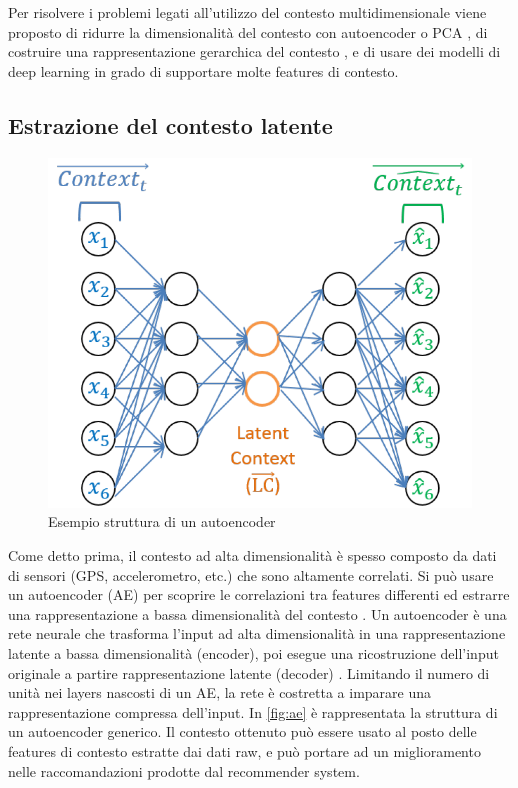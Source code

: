 \documentclass[12pt,italian]{report}
\begin{document}
Per risolvere i problemi legati all'utilizzo del contesto multidimensionale viene proposto di ridurre la dimensionalità del contesto con autoencoder o PCA \cite{latent-context} \cite{context-autoencoder}, di costruire una rappresentazione gerarchica del contesto \cite{hierarchical-context}, e di usare dei modelli di deep learning in grado di supportare molte features di contesto\cite{context-aware-deep-learning}.

\subsection{Estrazione del contesto latente} 
\label{ssec:latent-context}
\begin{figure}
 \centering
  \includegraphics[scale=0.70]{immagini/autoencoder.png}
  \caption{Esempio struttura di un autoencoder}
  \label{fig:ae}
\end{figure}

Come detto prima, il contesto ad alta dimensionalità è spesso composto da dati di sensori (GPS, accelerometro, etc.) che sono altamente correlati. Si può usare un autoencoder (AE) per scoprire le correlazioni tra features differenti ed estrarre una rappresentazione a bassa dimensionalità del contesto \cite{latent-context}. Un autoencoder è una rete neurale che trasforma l'input ad alta dimensionalità in una rappresentazione latente a bassa dimensionalità (encoder), poi esegue una ricostruzione dell'input originale a partire rappresentazione latente (decoder) \cite{autoencoder}. Limitando il numero di unità nei layers nascosti di un AE, la rete è costretta a imparare una rappresentazione compressa dell'input. In \autoref{fig:ae} è rappresentata la struttura di un autoencoder generico. Il contesto ottenuto può essere usato al posto delle features di contesto estratte dai dati raw, e può portare ad un miglioramento nelle raccomandazioni prodotte dal recommender system.
\end{document}
